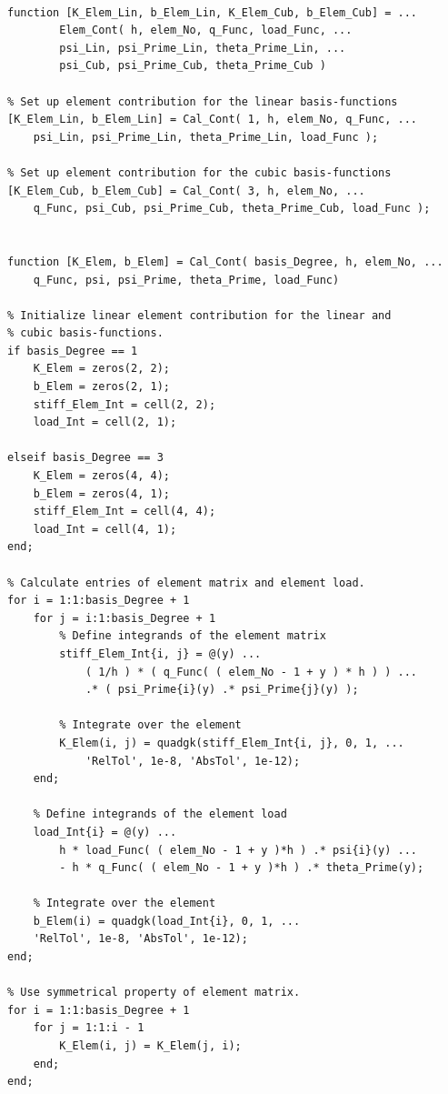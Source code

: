 \begin{lstlisting}[caption = {Element Contributions in both Linear and Cubic Case}, label = lst:Elem_Cont]

function [K_Elem_Lin, b_Elem_Lin, K_Elem_Cub, b_Elem_Cub] = ...
        Elem_Cont( h, elem_No, q_Func, load_Func, ...
        psi_Lin, psi_Prime_Lin, theta_Prime_Lin, ...
        psi_Cub, psi_Prime_Cub, theta_Prime_Cub )

% Set up element contribution for the linear basis-functions
[K_Elem_Lin, b_Elem_Lin] = Cal_Cont( 1, h, elem_No, q_Func, ...
    psi_Lin, psi_Prime_Lin, theta_Prime_Lin, load_Func );

% Set up element contribution for the cubic basis-functions
[K_Elem_Cub, b_Elem_Cub] = Cal_Cont( 3, h, elem_No, ...
    q_Func, psi_Cub, psi_Prime_Cub, theta_Prime_Cub, load_Func );


function [K_Elem, b_Elem] = Cal_Cont( basis_Degree, h, elem_No, ...
    q_Func, psi, psi_Prime, theta_Prime, load_Func)

% Initialize linear element contribution for the linear and
% cubic basis-functions.
if basis_Degree == 1
    K_Elem = zeros(2, 2);
    b_Elem = zeros(2, 1);
    stiff_Elem_Int = cell(2, 2);
    load_Int = cell(2, 1);

elseif basis_Degree == 3
    K_Elem = zeros(4, 4);
    b_Elem = zeros(4, 1);
    stiff_Elem_Int = cell(4, 4);
    load_Int = cell(4, 1);
end;

% Calculate entries of element matrix and element load.
for i = 1:1:basis_Degree + 1
    for j = i:1:basis_Degree + 1
        % Define integrands of the element matrix
        stiff_Elem_Int{i, j} = @(y) ...
            ( 1/h ) * ( q_Func( ( elem_No - 1 + y ) * h ) ) ...
            .* ( psi_Prime{i}(y) .* psi_Prime{j}(y) );
        
        % Integrate over the element
        K_Elem(i, j) = quadgk(stiff_Elem_Int{i, j}, 0, 1, ...
            'RelTol', 1e-8, 'AbsTol', 1e-12);
    end;
    
	% Define integrands of the element load
	load_Int{i} = @(y) ...
        h * load_Func( ( elem_No - 1 + y )*h ) .* psi{i}(y) ...
        - h * q_Func( ( elem_No - 1 + y )*h ) .* theta_Prime(y);
    
    % Integrate over the element
    b_Elem(i) = quadgk(load_Int{i}, 0, 1, ...
    'RelTol', 1e-8, 'AbsTol', 1e-12);
end;

% Use symmetrical property of element matrix.
for i = 1:1:basis_Degree + 1
    for j = 1:1:i - 1
        K_Elem(i, j) = K_Elem(j, i);
    end;
end;

\end{lstlisting}
